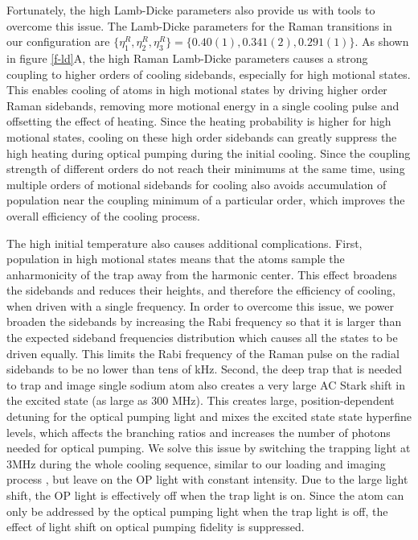 \documentclass[aps,prl,twocolumn,groupedaddress]{revtex4-1}
\begin{document}
Fortunately, the high Lamb-Dicke parameters also
provide us with tools to overcome this issue. The Lamb-Dicke parameters for the
Raman transitions in our configuration are $\{\eta^R_{1},\eta^R_{2},\eta^R_{3}\} = \{0.40(1), 0.341(2), 0.291(1)\}$. As shown in
figure \ref{f-ld}A, the high Raman Lamb-Dicke parameters causes a strong coupling to higher orders
of cooling sidebands, especially for high motional states.
This enables cooling of atoms in high motional states by driving higher order Raman sidebands,
removing more motional energy in a single cooling pulse and offsetting the effect of heating. Since the heating probability is higher for high motional states,
cooling on these high order sidebands can greatly suppress the high heating during
optical pumping during the initial cooling. Since the coupling strength of different orders
do not reach their minimums at the same time, using multiple orders of motional sidebands
for cooling also avoids accumulation of population near the coupling minimum of a particular
order, which improves the overall efficiency of the cooling process.

The high initial temperature also causes additional complications.
First, population in high motional states means that the atoms sample
the anharmonicity of the trap away from the harmonic center.
This effect broadens the sidebands and reduces their heights,
and therefore the efficiency of cooling, when driven with a single frequency.
In order to overcome this issue, we power broaden the sidebands by increasing the Rabi frequency
so that it is larger than the expected sideband frequencies distribution
which causes all the states to be driven equally.
This limits the Rabi frequency of the Raman pulse on the radial sidebands to be no lower
than tens of kHz.
Second, the deep trap that is needed to trap and image single sodium atom also creates
a very large AC Stark shift in the excited state (as large as 300 MHz).
This creates large, position-dependent detuning for the optical pumping light and mixes the excited state state hyperfine levels,
which affects the branching ratios and increases the number of photons needed for optical pumping.
We solve this issue by switching the trapping light at $3\text{MHz}$
during the whole cooling sequence, similar to our loading and imaging process \cite{Hutzler2017-LightShifts}, but leave on the OP light with constant intensity.
Due to the large light shift, the OP light is effectively off when the trap light is on.
Since the atom can only be addressed by the optical pumping light when the trap light is off,
the effect of light shift on optical pumping fidelity is suppressed.
\end{document}
